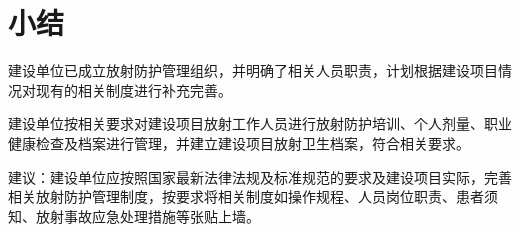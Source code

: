 \section{小结}

建设单位已成立放射防护管理组织，并明确了相关人员职责，计划根据建设项目情况对现有的相关制度进行补充完善。

建设单位按相关要求对建设项目放射工作人员进行放射防护培训、个人剂量、职业健康检查及档案进行管理，并建立建设项目放射卫生档案，符合相关要求。

建议：建设单位应按照国家最新法律法规及标准规范的要求及建设项目实际，完善相关放射防护管理制度，按要求将相关制度如操作规程、人员岗位职责、患者须知、放射事故应急处理措施等张贴上墙。
